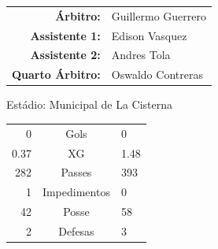 \documentclass[11pt]{article}
\begin{document}
\vspace{0.5cm}
\begin{minipage}{0.65\textwidth}
\begin{center}
\begin{tabular}{rl}
\textbf{Árbitro:} & Guillermo Guerrero \\
\textbf{Assistente 1:} & Edison Vasquez \\
\textbf{Assistente 2:} & Andres Tola \\
\textbf{Quarto Árbitro:} & Oswaldo Contreras \\
\end{tabular}
\end{center}
\end{minipage}
\begin{minipage}{0.3\textwidth}
Estádio: Municipal de La Cisterna\\
\begin{tabular}{rcl}
0 & Gols & 0 \\
0.37 & XG & 1.48 \\
282 & Passes & 393 \\
1 & Impedimentos & 0 \\
42 & Posse & 58 \\
2 & Defesas & 3 \\
\end{tabular}
\end{minipage}
\newpage
\end{document}
